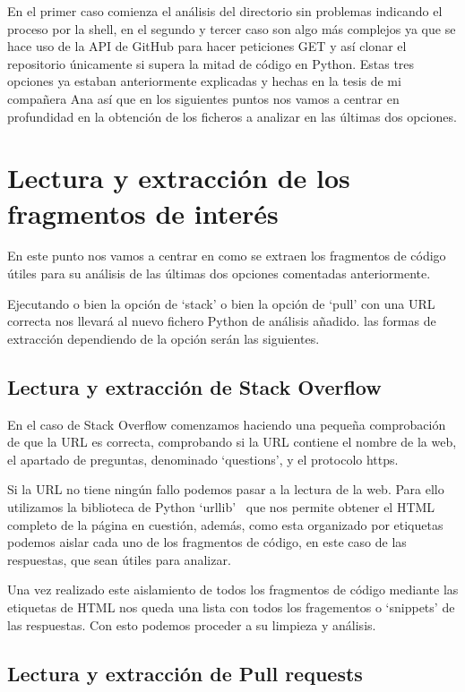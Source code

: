 \documentclass[a4paper, 12pt]{book}
\begin{document}
En el primer caso comienza el análisis del directorio sin problemas indicando el proceso por la shell, en el segundo y tercer caso son algo más complejos ya que se hace uso de la API de GitHub para hacer peticiones GET y así clonar el repositorio únicamente si supera la mitad de código en Python. Estas tres opciones ya estaban anteriormente explicadas y hechas en la tesis de mi compañera Ana así que en los siguientes puntos nos vamos a centrar en profundidad en la obtención de los ficheros a analizar en las últimas dos opciones.

\section{Lectura y extracción de los fragmentos de interés} 
\label{sec:Obtención de ficheros en las diferentes opciones}

En este punto nos vamos a centrar en como se extraen los fragmentos de código útiles para su análisis de las últimas dos opciones comentadas anteriormente.

Ejecutando o bien la opción de `stack' o bien la opción de `pull' con una URL correcta nos llevará al nuevo fichero Python de análisis añadido. las formas de extracción dependiendo de la opción serán las siguientes.

\subsection{Lectura y extracción de Stack Overflow}

En el caso de Stack Overflow comenzamos haciendo una pequeña comprobación de que la URL es correcta, comprobando si la URL contiene el nombre de la web, el apartado de preguntas, denominado `questions', y el protocolo https.

Si la URL no tiene ningún fallo podemos pasar a la lectura de la web. Para ello utilizamos la biblioteca de 
Python `urllib'~\cite{website:Urllib} que nos permite obtener el HTML completo de la página en cuestión, además, como esta organizado por etiquetas podemos aislar cada uno de los fragmentos de código, en este caso de las respuestas, que sean útiles para analizar.

Una vez realizado este aislamiento de todos los fragmentos de código mediante las etiquetas de HTML nos queda una lista con todos los fragementos o `snippets' de las respuestas. Con esto podemos proceder a su limpieza y análisis.

\subsection{Lectura y extracción de Pull requests}
\end{document}
